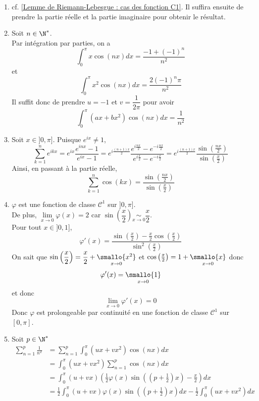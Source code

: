 \documentclass{book}
\begin{document}
	\begin{enumerate}[leftmargin=*]
		\item cf. \ref{Lemme de Riemann-Lebesgue : cas des fonction C1}. Il suffira ensuite de prendre la partie réelle et la partie imaginaire pour obtenir le résultat.
		\item Soit $n\in\N^*$.\\
		Par intégration par parties, on a 
		\[\int_{0}^{\pi}x\cos(nx)dx=\frac{-1+(-1)^n}{n^2}\]
		et \[\int_{0}^{\pi}x^2\cos(nx)dx=\frac{2(-1)^n\pi}{n^2}\]
		Il suffit donc de prendre $u=-1$ et $v=\dfrac{1}{2\pi}$ pour avoir 
		\[\int_{0}^{\pi}(ax+bx^2)\cos(nx)dx=\frac{1}{n^2}\]
		\item Soit $x\in]0,\pi]$. Puisque $e^{ix}\ne 1$,
		\[\sum_{k=1}^ne^{ikx} = e^{ix}\frac{e^{inx}-1}{e^{ix}-1} = e^{i\frac{(n+1)x}{2}}\frac{e^{i\frac{nx}{2}}-e^{-i\frac{nx}{2}}}{e^{i\frac{x}{2}}-e^{-i\frac{x}{2}}} = e^{i\frac{(n+1)x}{2}}\frac{\sin\left(\frac{nx}{2}\right)}{\sin\left(\frac{x}{2}\right)}\]
		Ainsi, en passant à la partie réelle, 
		\[\sum_{k=1}^n\cos(kx)=\frac{\sin\left(\frac{nx}{2}\right)}{\sin\left(\frac{x}{2}\right)}\]
		\item $\varphi$ est une fonction de classe $\mathcal C^1$ sur $]0,\pi]$.\\
		De plus, $\lim\limits_{x\to 0}\varphi(x)=2$ car $\sin\left(\dfrac{x}{2}\right)\underset{x\to 0}{\sim}\dfrac{x}{2}$.\\
		Pour tout $x\in]0,1]$, \[\varphi'(x)=\frac{\sin\left(\frac{x}{2}\right)-\frac{x}{2}\cos\left(\frac{x}{2}\right)}{\sin^2\left(\frac{x}{2}\right)}\]
		On sait que $\sin\left(\dfrac{x}{2}\right)=\dfrac{x}{2}+\underset{x\to 0}{\smallo{x^2}}$ et $\cos\left(\frac{x}{2}\right)=1+\underset{x\to 0}{\smallo{x}}$ donc 
		\[\varphi'(x)=\underset{x\to 0}{\smallo{1}}\]
		et donc \[\lim\limits_{x\to 0}\varphi'(x)=0\]
		Donc $\varphi$ est prolongeable par continuité en une fonction de classe $\mathcal C^1$ sur $[0,\pi]$.
		\item Soit $p\in\N^*$
		\begin{align*}
			\sum_{n=1}^{p}\frac{1}{n^2}&=\sum_{n=1}^{p}\int_{0}^{\pi}(ux+vx^2)\cos(nx)dx\\
			&=\int_{0}^{\pi}(ux+vx^2)\sum_{n=1}^{p}\cos(nx)dx\\
			&=\int_{0}^{\pi}(u+vx)\left(\frac{1}{2}\varphi(x)\sin\left(\left(p+\frac{1}{2}\right)x\right)-\frac{x}{2}\right)dx\\
			&=\frac{1}{2}\int_{0}^{\pi}(u+vx)\varphi(x)\sin\left(\left(p+\frac{1}{2}\right)x\right)dx-\frac{1}{2}\int_{0}^{\pi}(ux+vx^2)dx
		\end{align*}

\end{enumerate}
\end{document}
